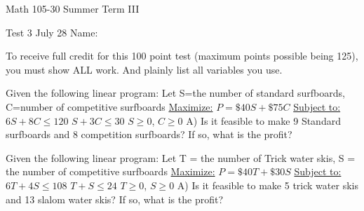 \documentclass[11pt,epsfig]{article}
\begin{document}
Math 105-30 Summer Term III 

Test 3 July 28\hspace{1.9in} {Name:} {\underline {\hspace{3.5in}}}
\vspace{1pc}

To receive full credit for this 100 point test (maximum points possible being 125), you must show ALL work. And plainly list all variables you use.
\vspace{0.5pc}






\begin{problem}{10}
Given the following linear program:
\newline
\newline
Let S=the number of standard surfboards, C=number of competitive surfboards
\newline
\underline{Maximize:}\hspace*{0.5cm} $P=\$40S+\$75C$
\newline
\underline{Subject to:}\hspace*{0.45cm}
$6S+8C\leq 120$ 
\newline
\hspace*{2.4cm}$S+3C\leq 30$
\newline
\hspace*{2.4cm}$S \geq 0$, $C\geq 0$
\newline
\newline
A) Is it feasible to make 9 Standard surfboards and 8 competition surfboards? If so, what is the profit?
\vfill
\end{problem}





\begin{problem}{10}
Given the following linear program:
\newline
\newline
Let T = the number of Trick water skis, S = the number of competitive surfboards
\newline
\underline{Maximize:}\hspace*{0.5cm}  $P=\$40T+\$30S$
\newline
\underline{Subject to:}\hspace*{0.45cm} $6T+4S\leq 108$ 
\newline
\hspace*{2.4cm}$T+S\leq 24$
\newline
\hspace*{2.4cm}$T \geq 0$, $S\geq 0$
\newline
\newline
A) Is it feasible to make 5 trick water skis and 13 slalom water skis? If so, what is the profit?
\vfill
\end{problem}
\end{document}
